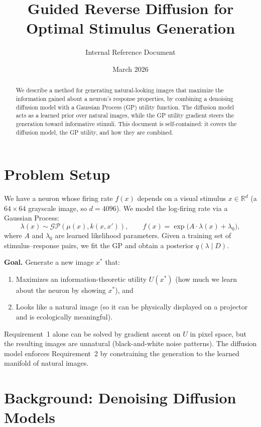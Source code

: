 \documentclass[11pt]{article}
\title{Guided Reverse Diffusion for Optimal Stimulus Generation}
\author{Internal Reference Document}
\date{March 2026}
\newcommand{\R}{\mathbb{R}}
\begin{document}
\maketitle

\begin{abstract}
We describe a method for generating natural-looking images that maximize the
information gained about a neuron's response properties, by combining a
denoising diffusion model with a Gaussian Process (GP) utility function.
The diffusion model acts as a learned prior over natural images, while the GP
utility gradient steers the generation toward informative stimuli.
This document is self-contained: it covers the diffusion model, the GP utility,
and how they are combined.
\end{abstract}

\section{Problem Setup}

We have a neuron whose firing rate $f(x)$ depends on a visual stimulus
$x \in \R^{d}$ (a $64 \times 64$ grayscale image, so $d = 4096$).
We model the log-firing rate via a Gaussian Process:
\[
  \lambda(x) \sim \mathcal{GP}(\mu(x), k(x, x')),
  \qquad
  f(x) = \exp\bigl(A \cdot \lambda(x) + \lambda_0\bigr),
\]
where $A$ and $\lambda_0$ are learned likelihood parameters.
Given a training set of stimulus--response pairs, we fit the GP and obtain a
posterior $q(\lambda \mid D)$.

\medskip
\noindent\textbf{Goal.}
Generate a new image $x^*$ that:
\begin{enumerate}
  \item Maximizes an information-theoretic utility $U(x^*)$ (how much we learn
        about the neuron by showing $x^*$), and
  \item Looks like a natural image (so it can be physically displayed on a
        projector and is ecologically meaningful).
\end{enumerate}

Requirement~1 alone can be solved by gradient ascent on $U$ in pixel space,
but the resulting images are unnatural (black-and-white noise patterns).
The diffusion model enforces Requirement~2 by constraining the generation
to the learned manifold of natural images.


\section{Background: Denoising Diffusion Models}
\end{document}
